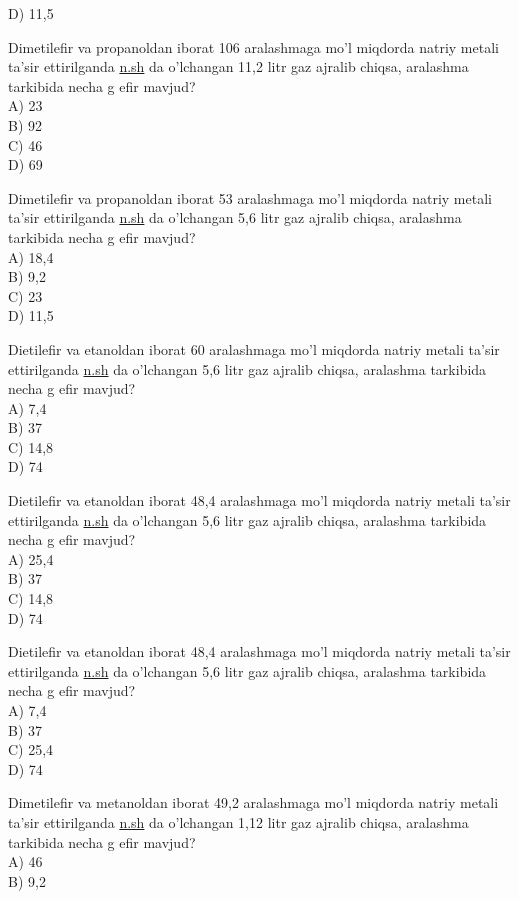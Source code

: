 D) 11,5
  \item Dimetilefir va propanoldan iborat 106 aralashmaga mo'l miqdorda natriy metali ta'sir ettirilganda \href{http://n.sh}{n.sh} da o'lchangan 11,2 litr gaz ajralib chiqsa, aralashma tarkibida necha g efir mavjud?\\
A) 23\\
B) 92\\
C) 46\\
D) 69
  \item Dimetilefir va propanoldan iborat 53 aralashmaga mo'l miqdorda natriy metali ta'sir ettirilganda \href{http://n.sh}{n.sh} da o'lchangan 5,6 litr gaz ajralib chiqsa, aralashma tarkibida necha g efir mavjud?\\
A) 18,4\\
B) 9,2\\
C) 23\\
D) 11,5
  \item Dietilefir va etanoldan iborat 60 aralashmaga mo'l miqdorda natriy metali ta'sir ettirilganda \href{http://n.sh}{n.sh} da o'lchangan 5,6 litr gaz ajralib chiqsa, aralashma tarkibida necha g efir mavjud?\\
A) 7,4\\
B) 37\\
C) 14,8\\
D) 74
  \item Dietilefir va etanoldan iborat 48,4 aralashmaga mo'l miqdorda natriy metali ta'sir ettirilganda \href{http://n.sh}{n.sh} da o'lchangan 5,6 litr gaz ajralib chiqsa, aralashma tarkibida necha g efir mavjud?\\
A) 25,4\\
B) 37\\
C) 14,8\\
D) 74
  \item Dietilefir va etanoldan iborat 48,4 aralashmaga mo'l miqdorda natriy metali ta'sir ettirilganda \href{http://n.sh}{n.sh} da o'lchangan 5,6 litr gaz ajralib chiqsa, aralashma tarkibida necha g efir mavjud?\\
A) 7,4\\
B) 37\\
C) 25,4\\
D) 74
  \item Dimetilefir va metanoldan iborat 49,2 aralashmaga mo'l miqdorda natriy metali ta'sir ettirilganda \href{http://n.sh}{n.sh} da o'lchangan 1,12 litr gaz ajralib chiqsa, aralashma tarkibida necha g efir mavjud?\\
A) 46\\
B) 9,2\\
